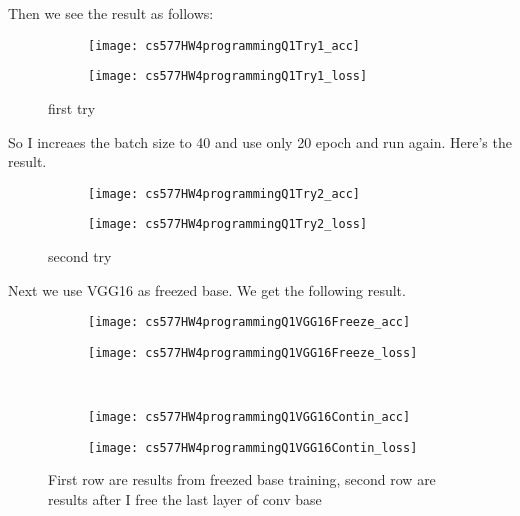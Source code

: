 \documentclass{article}
\begin{document}
Then we see the result as follows:

\begin{figure}[h!]
    \centering
    \begin{subfigure}{.48\textwidth}
        \centering
        \texttt{[image: cs577HW4programmingQ1Try1\_acc]}
    \end{subfigure}
    \begin{subfigure}{.48\textwidth}
        \centering
        \texttt{[image: cs577HW4programmingQ1Try1\_loss]}
    \end{subfigure}
    \caption{first try}
\end{figure}

So I increaes the batch size to 40 and use only 20 epoch and run again. Here's the result.

\begin{figure}[h!]
    \centering
    \begin{subfigure}{.48\textwidth}
        \centering
        \texttt{[image: cs577HW4programmingQ1Try2\_acc]}
    \end{subfigure}
    \begin{subfigure}{.48\textwidth}
        \centering
        \texttt{[image: cs577HW4programmingQ1Try2\_loss]}
    \end{subfigure}
    \caption{second try}
\end{figure}
\newpage
Next we use VGG16 as freezed base. We get the following result.
\begin{figure}[h!]
    \centering
    \begin{subfigure}{.40\textwidth}
        \centering
        \texttt{[image: cs577HW4programmingQ1VGG16Freeze\_acc]}
    \end{subfigure}
    \begin{subfigure}{.40\textwidth}
        \centering
        \texttt{[image: cs577HW4programmingQ1VGG16Freeze\_loss]}
    \end{subfigure}\\
    \begin{subfigure}{.40\textwidth}
        \centering
        \texttt{[image: cs577HW4programmingQ1VGG16Contin\_acc]}
    \end{subfigure}
    \begin{subfigure}{.40\textwidth}
        \centering
        \texttt{[image: cs577HW4programmingQ1VGG16Contin\_loss]}
    \end{subfigure}
    \caption{First row are results from freezed base training, second row are results after I free the last layer of conv base}
\end{figure}
\end{document}
